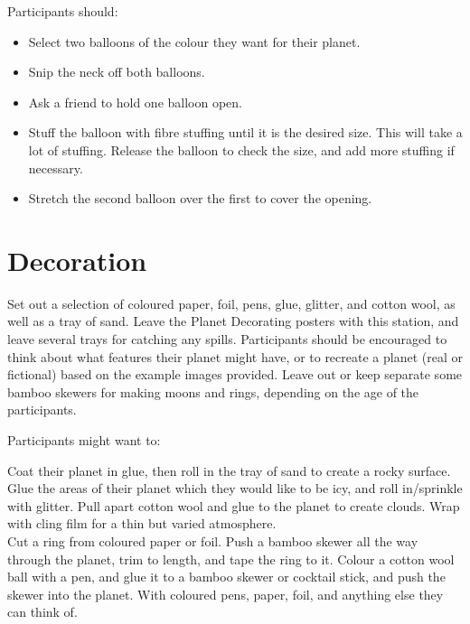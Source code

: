 \documentclass{article}
\begin{document}
Participants should:
\begin{itemize}
    \item Select two balloons of the colour they want for their planet.
    \item Snip the neck off both balloons.
    \item Ask a friend to hold one balloon open.
    \item Stuff the balloon with fibre stuffing until it is the desired size.
    This will take a lot of stuffing. Release the balloon to check the size, and
    add more stuffing if necessary.
    \item Stretch the second balloon over the first to cover the opening.
\end{itemize}

\section{Decoration}

Set out a selection of coloured paper, foil, pens, glue, glitter, and cotton
wool, as well as a tray of sand. Leave the Planet Decorating posters with this
station, and leave several trays for catching any spills. Participants should be
encouraged to think about what features their planet might have, or to recreate
a planet (real or fictional) based on the example images provided. Leave out or
keep separate some bamboo skewers for making moons and rings, depending on the age of the
participants.

Participants might want to:
\begin{itemize}[leftmargin = 1.2in]
     Coat their planet in glue, then roll in the
    tray of sand to create a rocky surface. 
     Glue the areas of their planet which they would
    like to be icy, and roll in/sprinkle with glitter. 
     Pull apart cotton wool and glue to the planet to
    create clouds. 
     Wrap with cling film for a thin but varied
    atmosphere. \\
     Cut a ring from coloured paper or foil. Push a bamboo 
    skewer all the way through the planet, trim to length, and tape the ring to it.
     Colour a cotton wool ball with a pen, and glue it to a
    bamboo skewer or cocktail stick, and push the skewer into the planet.
     With coloured pens, paper, foil, and anything else
    they can think of.
\end{itemize}
\end{document}
